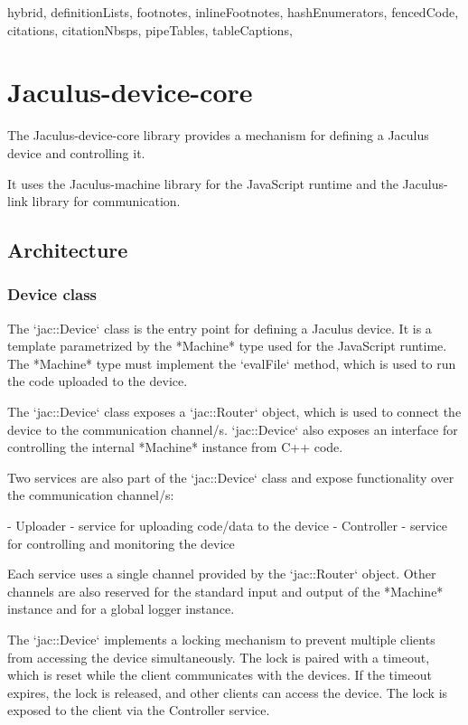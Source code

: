 \documentclass[
  digital,
  oneside,
  nosansbold,
  nocolorbold,
  lof,
  lot
]{fithesis4}
\begin{document}
\begin{markdown*}{%
  hybrid,
  definitionLists,
  footnotes,
  inlineFootnotes,
  hashEnumerators,
  fencedCode,
  citations,
  citationNbsps,
  pipeTables,
  tableCaptions,
}
\chapter{Jaculus-device-core}

The Jaculus-device-core library provides a mechanism for defining a Jaculus device and controlling it.

It uses the Jaculus-machine library for the JavaScript runtime and the Jaculus-link library for communication.



\section{Architecture}

\subsection{Device class}

The `jac::Device` class is the entry point for defining a Jaculus device. It is a template parametrized by the *Machine* type used for the JavaScript runtime. The *Machine* type must implement the `evalFile` method, which is used to run the code uploaded to the device.

The `jac::Device` class exposes a `jac::Router` object, which is used to connect the device to the communication channel/s. `jac::Device` also exposes an interface for controlling the internal *Machine* instance from C++ code.

Two services are also part of the `jac::Device` class and expose functionality over the communication channel/s:

  - Uploader - service for uploading code/data to the device
  - Controller - service for controlling and monitoring the device

Each service uses a single channel provided by the `jac::Router` object. Other channels are also reserved for the standard input and output of the *Machine* instance and for a global logger instance.

The `jac::Device` implements a locking mechanism to prevent multiple clients from accessing the device simultaneously. The lock is paired with a timeout, which is reset while the client communicates with the devices. If the timeout expires, the lock is released, and other clients can access the device. The lock is exposed to the client via the Controller service.



\end{markdown*}
\end{document}
